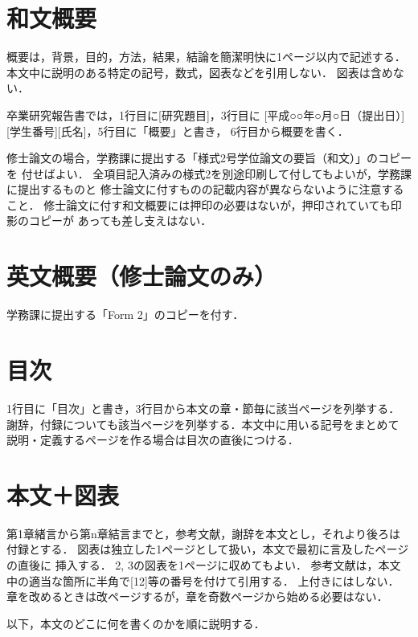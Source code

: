 \documentclass[main]{subfiles}
\begin{document}
\section{和文概要}
概要は，背景，目的，方法，結果，結論を簡潔明快に1ページ以内で記述する．
本文中に説明のある特定の記号，数式，図表などを引用しない．
図表は含めない．

卒業研究報告書では，1行目に[研究題目]，3行目に
[平成○○年○月○日（提出日）][学生番号][氏名]，5行目に「概要」と書き，
6行目から概要を書く．

修士論文の場合，学務課に提出する「様式2号学位論文の要旨（和文）」のコピーを
付せばよい．
全項目記入済みの様式2を別途印刷して付してもよいが，学務課に提出するものと
修士論文に付すものの記載内容が異ならないように注意すること．
修士論文に付す和文概要には押印の必要はないが，押印されていても印影のコピーが
あっても差し支えはない．

\section{英文概要（修士論文のみ）}
学務課に提出する「Form 2」のコピーを付す．

\section{目次}
1行目に「目次」と書き，3行目から本文の章・節毎に該当ページを列挙する．
謝辞，付録についても該当ページを列挙する．本文中に用いる記号をまとめて
説明・定義するページを作る場合は目次の直後につける．

\section{本文＋図表}
第1章緒言から第n章結言までと，参考文献，謝辞を本文とし，それより後ろは
付録とする．
図表は独立した1ページとして扱い，本文で最初に言及したページの直後に
挿入する．
2, 3の図表を1ページに収めてもよい．
参考文献は，本文中の適当な箇所に半角で[12]等の番号を付けて引用する．
上付きにはしない．
章を改めるときは改ページするが，章を奇数ページから始める必要はない．

以下，本文のどこに何を書くのかを順に説明する．
\end{document}
